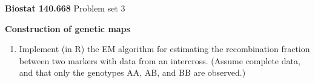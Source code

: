 \documentclass[12pt]{article}
\begin{document}
\noindent \textbf{Biostat 140.668} \hfill Problem set 3

\bigskip 

\noindent \textbf{Construction of genetic maps}

\begin{enumerate}

\item Implement (in R) the EM algorithm for estimating the
recombination fraction between two markers with data from an
intercross.  (Assume complete data, and that only the genotypes AA,
AB, and BB are observed.)

\end{enumerate}
\end{document}
